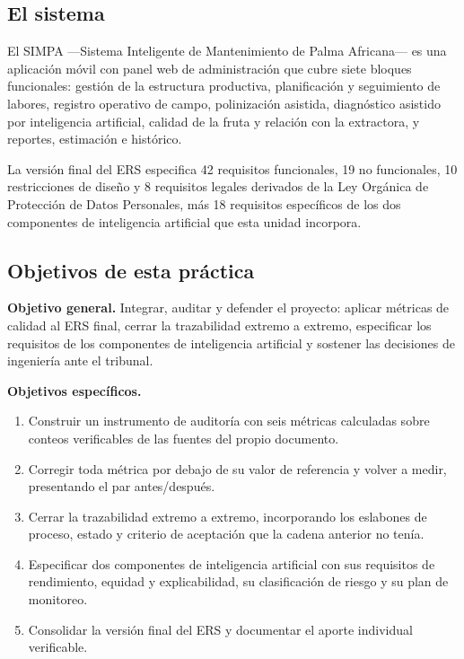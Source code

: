 \subsection{El sistema}

El SIMPA ---Sistema Inteligente de Mantenimiento de Palma Africana--- es una aplicación móvil con
panel web de administración que cubre siete bloques funcionales: gestión de la estructura productiva,
planificación y seguimiento de labores, registro operativo de campo, polinización asistida,
diagnóstico asistido por inteligencia artificial, calidad de la fruta y relación con la extractora, y
reportes, estimación e histórico.

La versión final del ERS especifica 42 requisitos funcionales, 19 no funcionales, 10 restricciones de
diseño y 8 requisitos legales derivados de la Ley Orgánica de Protección de Datos Personales, más 18
requisitos específicos de los dos componentes de inteligencia artificial que esta unidad incorpora.

\subsection{Objetivos de esta práctica}

\noindent\textbf{Objetivo general.} Integrar, auditar y defender el proyecto: aplicar métricas de
calidad al ERS final, cerrar la trazabilidad extremo a extremo, especificar los requisitos de los
componentes de inteligencia artificial y sostener las decisiones de ingeniería ante el tribunal.

\noindent\textbf{Objetivos específicos.}

\begin{enumerate}[leftmargin=*, nosep]
  \item Construir un instrumento de auditoría con seis métricas calculadas sobre conteos verificables
        de las fuentes del propio documento.
  \item Corregir toda métrica por debajo de su valor de referencia y volver a medir, presentando el
        par antes/después.
  \item Cerrar la trazabilidad extremo a extremo, incorporando los eslabones de proceso, estado y
        criterio de aceptación que la cadena anterior no tenía.
  \item Especificar dos componentes de inteligencia artificial con sus requisitos de rendimiento,
        equidad y explicabilidad, su clasificación de riesgo y su plan de monitoreo.
  \item Consolidar la versión final del ERS y documentar el aporte individual verificable.
\end{enumerate}

